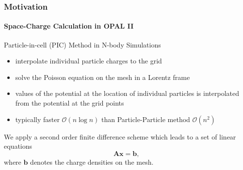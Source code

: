\documentclass[xcolor=pdftex,table,10pt]{beamer}
\newcommand{\opal}{\textsc{OPAL }}
\begin{document}
	\begin{frame}
		\frametitle{Motivation}
		\framesubtitle{Space-Charge Calculation in \opal II}

		\begin{block}{Particle-in-cell (PIC) Method in N-body Simulations}
		\begin{itemize}
			\item interpolate individual particle charges to the grid
			\item solve the Poisson equation on the mesh in a Lorentz frame
			\item values of the potential at the location of individual particles is interpolated from the potential at the grid points
			\item typically faster $\mathcal{O}(n \log{n})$ than Particle-Particle method $\mathcal{O}(n^2)$
		\end{itemize}
		\end{block}

		\vspace{0.8cm}
		\pause

		We apply a second order finite difference scheme which leads to a set of linear equations
		\[
			\mathbf{A} \mathbf{x} = \mathbf{b} \text{,}
		\]
		where $\textbf{b}$ denotes the charge densities on the mesh.
	\end{frame}
\end{document}
